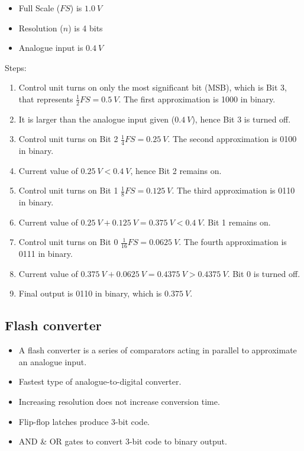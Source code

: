 \documentclass[11pt]{article}
\begin{document}
\begin{itemize}
\item Full Scale (\(FS\)) is \(\qty{1.0}{V}\)
\item Resolution (\(n\)) is 4 bits
\item Analogue input is \(\qty{0.4}{V}\)
\end{itemize}

Steps:
\begin{enumerate}
\item Control unit turns on only the most significant bit (MSB), which is Bit 3, that represents \(\frac{1}{2} FS = \qty{0.5}{V}\). The first approximation is 1000 in binary.
\item It is larger than the analogue input given (\(\qty{0.4}{V}\)), hence Bit 3 is turned off.
\item Control unit turns on Bit 2 \(\frac{1}{4} FS = \qty{0.25}{V}\). The second approximation is 0100 in binary.
\item Current value of \(\qty{0.25}{V} < \qty{0.4}{V}\), hence Bit 2 remains on.
\item Control unit turns on Bit 1 \(\frac{1}{8} FS = \qty{0.125}{V}\). The third approximation is 0110 in binary.
\item Current value of \(\qty{0.25}{V} + \qty{0.125}{V} = \qty{0.375}{V} < \qty{0.4}{V}\). Bit 1 remains on.
\item Control unit turns on Bit 0 \(\frac{1}{16} FS = \qty{0.0625}{V}\). The fourth approximation is 0111 in binary.
\item Current value of \(\qty{0.375}{V} + \qty{0.0625}{V} = \qty{0.4375}{V} > \qty{0.4375}{V}\). Bit 0 is turned off.
\item Final output is 0110 in binary, which is \(\qty{0.375}{V}\).
\end{enumerate}
\subsection{Flash converter}
\label{sec:orgad2a12b}
\begin{itemize}
\item A flash converter is a series of comparators acting in parallel to approximate an analogue input.
\item Fastest type of analogue-to-digital converter.
\item Increasing resolution does not increase conversion time.
\item Flip-flop latches produce 3-bit code.
\item AND \& OR gates to convert 3-bit code to binary output.
\end{itemize}
\end{document}
